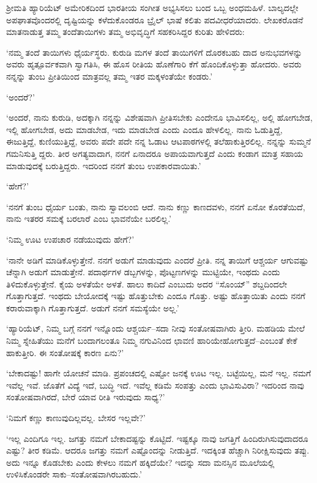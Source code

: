 ಶ‍್ರೀಮತಿ ಹ್ಯಾರಿಯೆಟ್ ಅಮೇರಿಕದಿಂದ ಭಾರತೀಯ ಸಂಗೀತ ಅಭ್ಯಸಿಸಲು ಬಂದ ಒಬ್ಬ ಅಂಧಮಹಿಳೆ. ಬಾಲ್ಯದಲ್ಲೇ ಅಪಘಾತವೊಂದರಲ್ಲಿ ದೃಷ್ಟಿಯನ್ನು ಕಳೆದುಕೊಂಡರೂ ಬ್ರೈಲ್ ಭಾಷೆ ಕಲಿತು ಪದವೀಧರೆಯಾದರು. ಲೇಖಕರೊಡನೆ ಮಾತನಾಡುತ್ತ ತಮ್ಮ ತಂದೆತಾಯಿಗಳು ತಮ್ಮ ಅಭಿವೃದ್ಧಿಗೆ ಸಹಕರಿಸಿದ್ದರ ಕುರಿತು ಹೇಳಿದರು:

‘ನಮ್ಮ ತಂದೆ ತಾಯಿಗಳು ಧೈರ್ಯಸ್ಥರು. ಕುರುಡಿ ಮಗಳ ತಂದೆ ತಾಯಿಗಳಿಗೆ ದೊರಕಬಹು ದಾದ ಅನುಭವಗಳನ್ನು ಅವರು ಹೃತ್ಪೂರ್ವಕವಾಗಿ ಸ್ವಾಗತಿಸಿ, ಈ ಹೊಸ ರೀತಿಯ ಹೊಣೆಗಾರಿ ಕೆಗೆ ಹೊಂದಿಕೊಳ್ಳುತ್ತಾ ಹೋದರು. ಅವರು ನನ್ನನ್ನು ತುಂಬ ಪ್ರೀತಿಯಿಂದ ಮಾತ್ರವಲ್ಲ ತಮ್ಮ ಇತರ ಮಕ್ಕಳಂತೆಯೇ ಕಂಡರು.’

‘ಅಂದರೆ?’

‘ಅಂದರೆ, ನಾನು ಕುರುಡಿ, ಅದಕ್ಕಾಗಿ ನನ್ನನ್ನು ವಿಶೇಷವಾಗಿ ಪ್ರೀತಿಸಬೇಕು ಎಂದೇನೂ ಭಾವಿಸಲಿಲ್ಲ, ಅಲ್ಲಿ ಹೋಗಬೇಡ, ಇಲ್ಲಿ ಹೋಗಬೇಡ, ಅದು ಮಾಡಬೇಡ, ಇದು ಮಾಡಬೇಡ ಎಂದು ಎಂದೂ ಹೇಳಲಿಲ್ಲ. ನಾನು ಓಡುತ್ತಿದ್ದೆ, ಈಜುತ್ತಿದ್ದೆ, ಕುಣಿಯುತ್ತಿದ್ದೆ, ಅವರು ಪದೇ ಪದೇ ನನ್ನ ಓಡಾಟ ಆಟಪಾಠಗಳಲ್ಲಿ ತಲೆಹಾಕುತ್ತಿರಲಿಲ್ಲ. ನನ್ನನ್ನು ಸುಮ್ಮನೆ ಗಮನಿಸುತ್ತಿ ದ್ದರು. ತೀರ ಅಗತ್ಯವಾದಾಗ, ನನಗೆ ಏನಾದರೂ ಅಪಾಯವಾಗುತ್ತದೆ ಎಂದು ಕಂಡಾಗ ಮಾತ್ರ ಸಹಾಯ ಮಾಡುವುದಕ್ಕೆ ಬರುತ್ತಿದ್ದರು. ಇದರಿಂದ ನನಗೆ ತುಂಬ ಉಪಕಾರವಾಯಿತು.’

‘ಹೇಗೆ?’

‘ನನಗೆ ತುಂಬ ಧೈರ್ಯ ಬಂತು, ನಾನು ಸ್ವಾವಲಂಬಿ ಆದೆ. ನಾನು ಕಣ್ಣು ಕಾಣದವಳು, ನನಗೆ ಏನೋ ಕೊರತೆಯಿದೆ, ನಾನು ಇತರರ ಸಮಕ್ಕೆ ಬರಲಾರೆ ಎಂಬ ಭಾವನೆಯೇ ಬರಲಿಲ್ಲ.’

‘ನಿಮ್ಮ ಊಟ ಉಪಚಾರ ನಡೆಯುವುದು ಹೇಗೆ?’

‘ನಾನೇ ಅಡಿಗೆ ಮಾಡಿಕೊಳ್ಳುತ್ತೇನೆ. ನನಗೆ ಅಡುಗೆ ಮಾಡುವುದು ಎಂದರೆ ಪ್ರೀತಿ. ನನ್ನ ತಾಯಿಗೆ ಆಶ್ಚರ್ಯ ಆಗುವಷ್ಟು ಚೆನ್ನಾಗಿ ಅಡುಗೆ ಮಾಡುತ್ತೇನೆ. ಪದಾರ್ಥಗಳ ಡಬ್ಬಗಳನ್ನು, ಪೊಟ್ಟಣಗಳನ್ನು ಮುಟ್ಟಿಯೇ, ಇಂಥದು ಎಂದು ತಿಳಿದುಕೊಳ್ಳುತ್ತೇನೆ. ಕೈಯ ಅಳತೆಯೇ ಅಳತೆ. ಹಾಲು ಕಾದಿದೆ ಎಂಬುದು ಅದರ “ಸೊಂಯ್​” ಶಬ್ದದಿಂದಲೇ ಗೊತ್ತಾಗುತ್ತದೆ. ಇಂಥದು ಬೇಯೋದಕ್ಕೆ ಇಷ್ಟು ಹೊತ್ತುಬೇಕು ಎಂದೂ ಗೊತ್ತು. ಅಷ್ಟು ಹೊತ್ತಾಯಿತು ಎಂದು ನನಗೆ ಕರಾರುವಾಕ್ಕಾಗಿ ಗೊತ್ತಾಗುತ್ತದೆ. ಅಡುಗೆ ನನಗೆ ಸಮಸ್ಯೆಯೇ ಅಲ್ಲ.’

‘ಹ್ಯಾರಿಯೆಟ್, ನಿಮ್ಮ ಬಗ್ಗೆ ನನಗೆ ಇನ್ನೊಂದು ಆಶ್ಚರ್ಯ–ಸದಾ ನೀವು ಸಂತೋಷವಾಗಿರು ತ್ತೀರಿ. ಮಹಡಿಯ ಮೇಲೆ ನಿಮ್ಮ ಸ್ನೇಹಿತೆಯು ಮನೆಗೆ ಬಂದಾಗಲಂತೂ ನಿಮ್ಮ ನಗುವಿನಿಂದ ಛಾವಣಿ ಹಾರಿಯೇಹೋಗುತ್ತದೆ–ಎಂಬಂತೆ ಕೇಕೆ ಹಾಕುತ್ತೀರಿ. ಈ ಸಂತೋಷಕ್ಕೆ ಕಾರಣ ಏನು?’

‘ಬೇಕಾದಷ್ಟು! ಹಾಗೇ ಯೋಚನೆ ಮಾಡಿ. ಪ್ರಪಂಚದಲ್ಲಿ ಎಷ್ಟೋ ಜನಕ್ಕೆ ಊಟ ಇಲ್ಲ. ಬಟ್ಟೆಯಿಲ್ಲ, ಮನೆ ಇಲ್ಲ. ನಮಗೆ ಇವೆಲ್ಲ ಇವೆ. ಜೊತೆಗೆ ವಿದ್ಯೆ ಇದೆ, ಬುದ್ಧಿ ಇದೆ. ಇವೆಲ್ಲ ಕಡಿಮೆ ಸಂಪತ್ತು ಎಂದು ಭಾವಿಸುವಿರಾ? ಇದರಿಂದ ನಾವು ಸಂತೋಷವಾಗಿರದೆ, ಬೇರೆ ಯಾವ ರೀತಿ ಇರುವುದು ಸಾಧ್ಯ?’

‘ನಿಮಗೆ ಕಣ್ಣು ಕಾಣುವುದಿಲ್ಲವಲ್ಲ. ಬೇಸರ ಇಲ್ಲವೇ?’

‘ಇಲ್ಲ ಎಂದಿಗೂ ಇಲ್ಲ. ಜಗತ್ತು ನಮಗೆ ಬೇಕಾದಷ್ಟನ್ನು ಕೊಟ್ಟಿದೆ. ಇಷ್ಟಕ್ಕೂ ನಾವು ಜಗತ್ತಿಗೆ ಹಿಂದಿರುಗಿಸುವುದಾದರೂ ಎಷ್ಟು? ತೀರ ಕಡಿಮೆ. ಆದರೂ ಜಗತ್ತು ನಮಗೆ ಎಷ್ಟೊಂದನ್ನು ನೀಡುತ್ತಿದೆ. ಇದಕ್ಕಿಂತ ಹೆಚ್ಚಾಗಿ ನಿರೀಕ್ಷಿಸುವುದು ತಪ್ಪು. ಅದು ಇನ್ನೂ ಕೊಡಬೇಕು ಎಂದು ಕೇಳಲು ನಮಗೆ ಹಕ್ಕಿದೆಯೇ? ಇದನ್ನು ಸದಾ ಮನಸ್ಸಿನ ಮೂಲೆಯಲ್ಲಿ ಉಳಿಸಿಕೊಂಡರೇ ಸಾಕು–ಸಂತೋಷವಾಗಿರಬಹುದು.’

